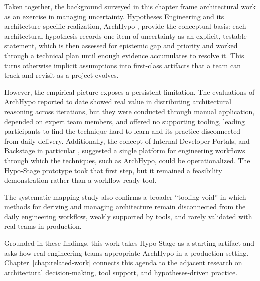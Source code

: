 Taken together, the background surveyed in this chapter frame architectural work as an
exercise in managing uncertainty. Hypotheses Engineering \citep{melegati2019he} and its
architecture-specific realization, ArchHypo \citep{silva2024tse}, provide the conceptual
basis: each architectural hypothesis records one item of uncertainty as an explicit,
testable statement, which is then assessed for epistemic gap and priority and worked
through a technical plan until enough evidence accumulates to resolve it. This turns
otherwise implicit assumptions into first-class artifacts that a team can track and
revisit as a project evolves.

However, the empirical picture exposes a persistent limitation. The evaluations of
ArchHypo reported to date \citep{silva2024ieeesw,silva2024tse} showed real value in
distributing architectural reasoning across iterations, but they were conducted through
manual application, depended on expert team members, and offered no supporting tooling, leading
participants to find the technique hard to learn and its practice disconnected from
daily delivery. Additionally, the concept of Internal Developer Portals, and Backstage in particular
\citep{anjum2026idp,backstage2024}, suggested a single platform
for engineering workflows through which the techniques, such as ArchHypo, could be
operationalized. The Hypo-Stage prototype \citep{correa2025} took that first step, but it remained a feasibility demonstration rather than a workflow-ready tool.

The systematic mapping study \citep{souza2019} also confirms a
broader ``tooling void'' in which methods for deriving and managing architecture remain
disconnected from the daily engineering workflow, weakly supported by tools, and rarely
validated with real teams in production.

Grounded in these findings, this work takes Hypo-Stage as a starting artifact and asks how
real engineering teams appropriate ArchHypo in a production setting. Chapter~\ref{chap:related-work}
connects this agenda to the adjacent research on architectural decision-making, tool support, and hypotheses-driven practice.
